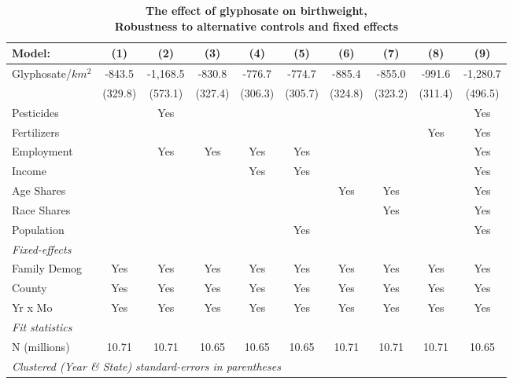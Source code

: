\begin{table}[htbp]
   \centering
   \small
   \begin{threeparttable}[b]
      \caption{\label{tab:robust-cntrl-dbwt-allyielddiffpercentilegmomax} \textbf{The effect of glyphosate on birthweight, \\ Robustness to alternative controls and fixed effects}}
      \begin{tabular}{lccccccccc}
         \toprule
         Model:            & (1)     & (2)      & (3)     & (4)     & (5)     & (6)     & (7)     & (8)     & (9)\\  
         \midrule 
         Glyphosate/$km^2$ & -843.5  & -1,168.5 & -830.8  & -776.7  & -774.7  & -885.4  & -855.0  & -991.6  & -1,280.7\\   
                           & (329.8) & (573.1)  & (327.4) & (306.3) & (305.7) & (324.8) & (323.2) & (311.4) & (496.5)\\   
         Pesticides        &         & Yes      &         &         &         &         &         &         & Yes\\  
         Fertilizers       &         &          &         &         &         &         &         & Yes     & Yes\\  
         Employment        &         & Yes      & Yes     & Yes     & Yes     &         &         &         & Yes\\  
         Income            &         &          &         & Yes     & Yes     &         &         &         & Yes\\  
         Age Shares        &         &          &         &         &         & Yes     & Yes     &         & Yes\\  
         Race Shares       &         &          &         &         &         &         & Yes     &         & Yes\\  
         Population        &         &          &         &         & Yes     &         &         &         & Yes\\  
         \midrule
         \emph{Fixed-effects}\\
         Family Demog      & Yes     & Yes      & Yes     & Yes     & Yes     & Yes     & Yes     & Yes     & Yes\\  
         County            & Yes     & Yes      & Yes     & Yes     & Yes     & Yes     & Yes     & Yes     & Yes\\  
         Yr x Mo           & Yes     & Yes      & Yes     & Yes     & Yes     & Yes     & Yes     & Yes     & Yes\\  
         \midrule
         \emph{Fit statistics}\\
         N (millions)      & 10.71   & 10.71    & 10.65   & 10.65   & 10.65   & 10.71   & 10.71   & 10.71   & 10.65\\  
         \midrule
         \multicolumn{10}{l}{\emph{Clustered (Year \& State) standard-errors in parentheses}}\\
      \end{tabular}
      

\end{threeparttable}
\end{table}
